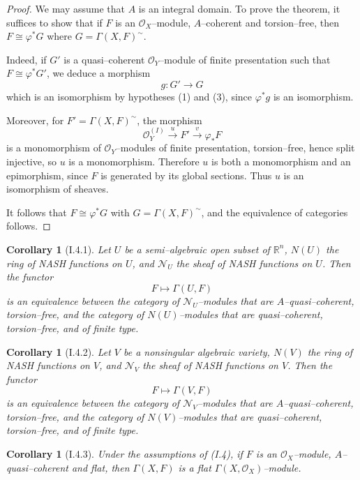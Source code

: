 \documentclass[a4paper]{amsart}
\newtheorem{cor}[theorem]{Corollary}
\theoremstyle{definition}
\theoremstyle{definition}
\begin{document}
\begin{proof}
We may assume that $A$ is an integral domain. To prove the theorem, it suffices to show that if $F$ is an $\mathcal{O}_X$–module, $A$–coherent and torsion–free, then $F \cong \varphi^* G$ where $G = \Gamma(X, F)^{\sim}$.

Indeed, if $G'$ is a quasi–coherent $\mathcal{O}_Y$–module of finite presentation such that $F \cong \varphi^* G'$, we deduce a morphism
\[
g : G' \longrightarrow G
\]
which is an isomorphism by hypotheses (1) and (3), since $\varphi^* g$ is an isomorphism.

Moreover, for $F' = \Gamma(X, F)^{\sim}$, the morphism
\[
\mathcal{O}_Y^{(I)} \xrightarrow{u} F' \xrightarrow{v} \varphi_* F
\]
is a monomorphism of $\mathcal{O}_Y$–modules of finite presentation, torsion–free, hence split injective, so $u$ is a monomorphism. Therefore $u$ is both a monomorphism and an epimorphism, since $F$ is generated by its global sections. Thus $u$ is an isomorphism of sheaves.

It follows that $F \cong \varphi^* G$ with $G = \Gamma(X, F)^{\sim}$, and the equivalence of categories follows.
\end{proof}

\begin{cor}[I.4.1]
Let $U$ be a semi–algebraic open subset of $\mathbb{R}^n$, $N(U)$ the ring of NASH functions on $U$, and $\mathcal{N}_U$ the sheaf of NASH functions on $U$. Then the functor
\[
F \longmapsto \Gamma(U, F)
\]
is an equivalence between the category of $\mathcal{N}_U$–modules that are $A$–quasi–coherent, torsion–free, and the category of $N(U)$–modules that are quasi–coherent, torsion–free, and of finite type.
\end{cor}

\begin{cor}[I.4.2]
Let $V$ be a nonsingular algebraic variety, $N(V)$ the ring of NASH functions on $V$, and $\mathcal{N}_V$ the sheaf of NASH functions on $V$. Then the functor
\[
F \longmapsto \Gamma(V, F)
\]
is an equivalence between the category of $\mathcal{N}_V$–modules that are $A$–quasi–coherent, torsion–free, and the category of $N(V)$–modules that are quasi–coherent, torsion–free, and of finite type.
\end{cor}

\begin{cor}[I.4.3]
Under the assumptions of (I.4), if $F$ is an $\mathcal{O}_X$–module, $A$–quasi–coherent and flat, then $\Gamma(X, F)$ is a flat $\Gamma(X, \mathcal{O}_X)$–module.
\end{cor}
\end{document}
